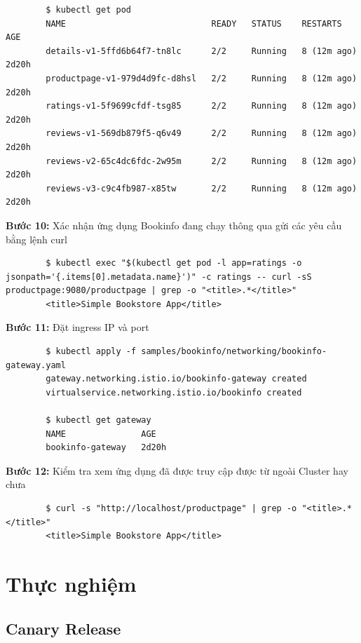 \documentclass[14pt,a4paper]{book}
\begin{document}
{{\begin{lstlisting}
		$ kubectl get pod
		NAME                             READY   STATUS    RESTARTS      AGE
		details-v1-5ffd6b64f7-tn8lc      2/2     Running   8 (12m ago)   2d20h
		productpage-v1-979d4d9fc-d8hsl   2/2     Running   8 (12m ago)   2d20h
		ratings-v1-5f9699cfdf-tsg85      2/2     Running   8 (12m ago)   2d20h
		reviews-v1-569db879f5-q6v49      2/2     Running   8 (12m ago)   2d20h
		reviews-v2-65c4dc6fdc-2w95m      2/2     Running   8 (12m ago)   2d20h
		reviews-v3-c9c4fb987-x85tw       2/2     Running   8 (12m ago)   2d20h
	\end{lstlisting}
	\textbf{Bước 10:} Xác nhận ứng dụng Bookinfo đang chạy thông qua gửi các yêu cầu bằng lệnh {\color{red}curl} 
	\begin{lstlisting}
		$ kubectl exec "$(kubectl get pod -l app=ratings -o jsonpath='{.items[0].metadata.name}')" -c ratings -- curl -sS productpage:9080/productpage | grep -o "<title>.*</title>"
		<title>Simple Bookstore App</title>
	\end{lstlisting}
	\textbf{Bước 11:} Đặt ingress IP và port
	\begin{lstlisting}
		$ kubectl apply -f samples/bookinfo/networking/bookinfo-gateway.yaml
		gateway.networking.istio.io/bookinfo-gateway created
		virtualservice.networking.istio.io/bookinfo created
		
		$ kubectl get gateway
		NAME               AGE
		bookinfo-gateway   2d20h
	\end{lstlisting}
	\textbf{Bước 12:} Kiểm tra xem ứng dụng đã được truy cập được từ ngoài Cluster hay chưa
	\begin{lstlisting}
		$ curl -s "http://localhost/productpage" | grep -o "<title>.*</title>"
		<title>Simple Bookstore App</title>
	\end{lstlisting}
	\section{Thực nghiệm}
			\subsection{Canary Release}
}}
\end{document}
